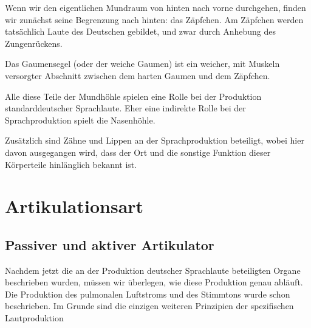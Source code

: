 Wenn wir den eigentlichen Mundraum von hinten nach vorne durchgehen, finden wir zunächst seine Begrenzung nach hinten: das Zäpfchen.
Am Zäpfchen werden tatsächlich Laute des Deutschen gebildet, und zwar durch Anhebung des Zungenrückens.

Das Gaumensegel (oder der weiche Gaumen) ist ein weicher, mit Muskeln versorgter Abschnitt zwischen dem harten Gaumen und dem Zäpfchen.


Alle diese Teile der Mundhöhle spielen eine Rolle bei der Produktion standarddeutscher Sprachlaute.
Eher eine indirekte Rolle bei der Sprachproduktion spielt die Nasenhöhle.


Zusätzlich sind Zähne und Lippen an der Sprachproduktion beteiligt, wobei hier davon ausgegangen wird, dass der Ort und die sonstige Funktion dieser Körperteile hinlänglich bekannt ist.

\section{Artikulationsart}

\label{sec:artikulationsart}

\subsection{Passiver und aktiver Artikulator}

\label{sec:artikulator}

Nachdem jetzt die an der Produktion deutscher Sprachlaute beteiligten Organe beschrieben wurden, müssen wir überlegen, wie diese Produktion genau abläuft.
Die Produktion des pulmonalen Luftstroms und des Stimmtons wurde schon beschrieben.
Im Grunde sind die einzigen weiteren Prinzipien der spezifischen Lautproduktion

